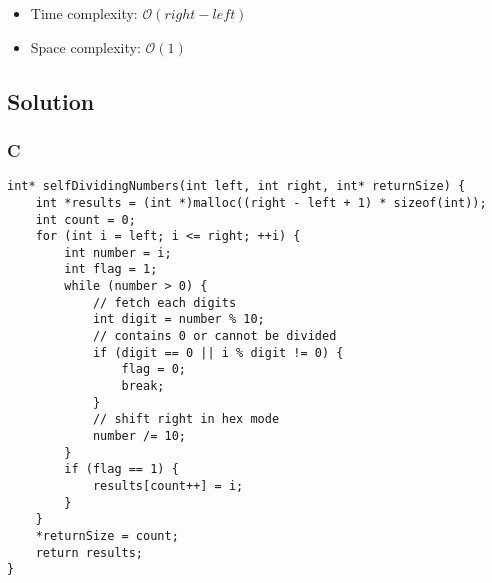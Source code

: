 \begin{itemize}
    \item Time complexity: $\mathcal{O}(right - left)$
    \item Space complexity: $\mathcal{O}(1)$
\end{itemize}

\subsection*{Solution}
\subsubsection{C}
\begin{verbatim}
int* selfDividingNumbers(int left, int right, int* returnSize) {
    int *results = (int *)malloc((right - left + 1) * sizeof(int));
    int count = 0;
    for (int i = left; i <= right; ++i) {
        int number = i;
        int flag = 1;
        while (number > 0) {
            // fetch each digits
            int digit = number % 10;
            // contains 0 or cannot be divided
            if (digit == 0 || i % digit != 0) {
                flag = 0;
                break;
            }
            // shift right in hex mode
            number /= 10;
        }
        if (flag == 1) {
            results[count++] = i;
        }
    }
    *returnSize = count;
    return results;
}
\end{verbatim}

\newpage

